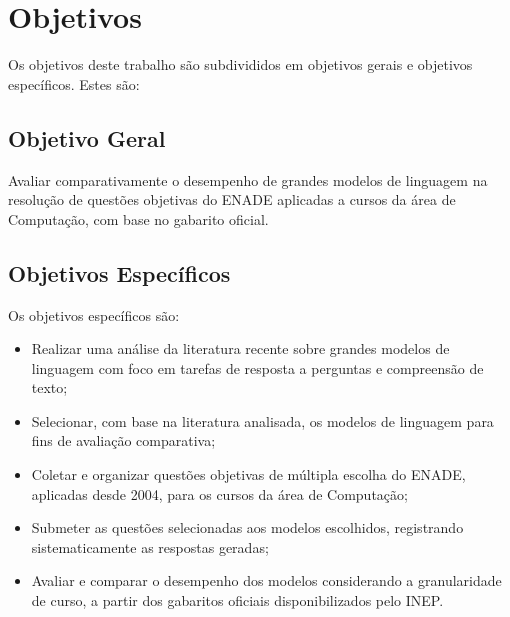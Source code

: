 \section{Objetivos}

Os objetivos deste trabalho são subdivididos em objetivos gerais e objetivos específicos. Estes são:

\subsection{Objetivo Geral}

Avaliar comparativamente o desempenho de grandes modelos de linguagem na resolução de questões objetivas do ENADE aplicadas a cursos da área de Computação, com base no gabarito oficial.

\subsection{Objetivos Específicos}

Os objetivos específicos são:

\begin{itemize}
    \item Realizar uma análise da literatura recente sobre grandes modelos de linguagem com foco em tarefas de resposta a perguntas e compreensão de texto;

    \item Selecionar, com base na literatura analisada, os modelos de linguagem para fins de avaliação comparativa;
    
    \item Coletar e organizar questões objetivas de múltipla escolha do ENADE, aplicadas desde 2004, para os cursos da área de Computação;
    
    \item Submeter as questões selecionadas aos modelos escolhidos, registrando sistematicamente as respostas geradas;

    \item Avaliar e comparar o desempenho dos modelos considerando a granularidade de curso, a partir dos gabaritos oficiais disponibilizados pelo INEP.
\end{itemize}

